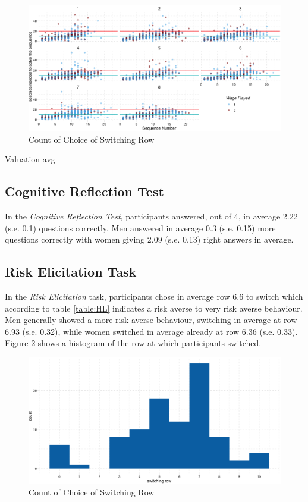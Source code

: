 \begin{figure}
    \centering
    \includegraphics[width=\textwidth]{graphs/time_per_task.png}
    \caption{Count of Choice of Switching Row}
    \label{fig:time_per_task}
\end{figure}

Valuation avg \\

\subsection{Cognitive Reflection Test}
In the \textit{Cognitive Reflection Test}, participants answered, out of 4, in average 2.22 (s.e. 0.1) questions correctly. Men answered in average 0.3 (s.e. 0.15) more questions correctly with women giving 2.09 (s.e. 0.13) right answers in average.\\


\subsection{Risk Elicitation Task}
In the \textit{Risk Elicitation} task, participants chose in average row 6.6 to switch which according to table \ref{table:HL} indicates a risk averse to very risk averse behaviour. Men generally showed a more risk averse behaviour, switching in average at row 6.93 (s.e. 0.32), while women switched in average already at row 6.36 (s.e. 0.33). Figure \ref{fig:hist_mpl} shows a histogram of the row at which participants switched.\\

\begin{figure}
    \centering
    \includegraphics[width=\textwidth]{graphs/hist_mpl.png}
    \caption{Count of Choice of Switching Row}
    \label{fig:hist_mpl}
\end{figure}

